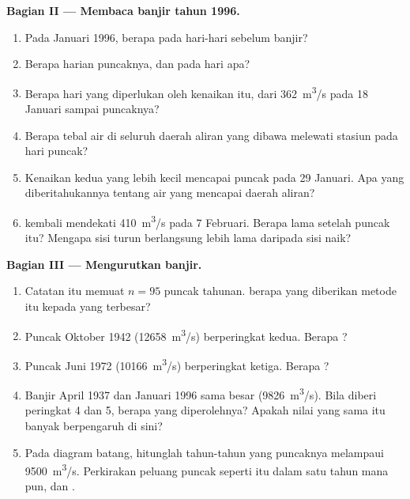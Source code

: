 \begin{problem}
\medskip
\noindent\textbf{Bagian II --- Membaca banjir tahun 1996.}
\begin{enumerate}[resume]
  \item Pada  Januari 1996, berapa  pada hari-hari
        sebelum banjir?
  \item Berapa  harian puncaknya, dan pada hari apa?
  \item Berapa hari yang diperlukan oleh kenaikan itu, dari
        \qty{362}{m^3/s} pada 18 Januari sampai puncaknya?
  \item Berapa tebal air di seluruh daerah aliran yang dibawa melewati
        stasiun pada hari puncak?
  \item Kenaikan kedua yang lebih kecil mencapai puncak pada 29 Januari. Apa
        yang diberitahukannya tentang air yang mencapai daerah aliran?
  \item {} kembali mendekati \qty{410}{m^3/s} pada 7 Februari. Berapa lama
        setelah puncak itu? Mengapa sisi turun berlangsung lebih lama daripada
        sisi naik?
\end{enumerate}

\medskip
\noindent\textbf{Bagian III --- Mengurutkan banjir.}
\begin{enumerate}[resume]
  \item Catatan itu memuat $n = 95$ puncak tahunan.  berapa yang
        diberikan metode itu kepada yang terbesar?
  \item Puncak Oktober 1942 (\qty{12658}{m^3/s}) berperingkat kedua. Berapa
        ?
  \item Puncak Juni 1972 (\qty{10166}{m^3/s}) berperingkat ketiga. Berapa
        ?
  \item Banjir April 1937 dan Januari 1996 sama besar (\qty{9826}{m^3/s}).
        Bila diberi peringkat 4 dan 5,  berapa yang diperolehnya?
        Apakah nilai yang sama itu banyak berpengaruh di sini?
  \item Pada diagram batang, hitunglah tahun-tahun yang puncaknya melampaui
        \qty{9500}{m^3/s}. Perkirakan peluang puncak seperti itu dalam satu
        tahun mana pun, dan .
\end{enumerate}


\end{problem}
